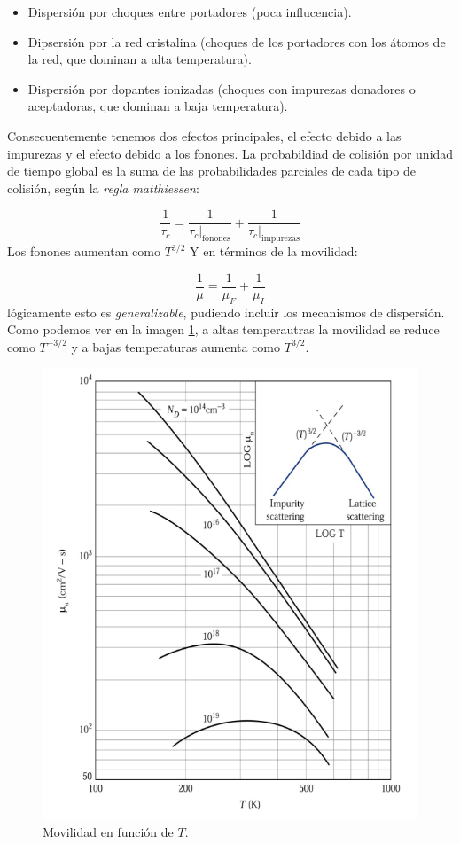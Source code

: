 \begin{itemize}
	\item Dispersión por choques entre portadores (poca influcencia).
	\item Dipsersión por la red cristalina (choques de los portadores con los átomos de la red, que dominan a alta temperatura).
	\item Dispersión por dopantes ionizadas (choques con impurezas donadores o aceptadoras, que dominan a baja temperatura).
\end{itemize}
Consecuentemente tenemos dos efectos principales, el efecto debido a las impurezas y el efecto debido a los fonones. La probabildiad de colisión por unidad de tiempo global es la suma de las probabilidades parciales de cada tipo de colisión, según la \textit{regla matthiessen}:

\begin{equation}
	\frac{1}{\tau_c} = \frac{1}{\tau_c|_{\text{fonones}}}+\frac{1}{\tau_c|_{\text{impurezas}}}
\end{equation}
Los fonones aumentan como $T^{3/2}$
Y en términos de la movilidad:

\begin{equation}
	\frac{1}{\mu}=\frac{1}{\mu_F}+\frac{1}{\mu_I}
\end{equation}
lógicamente esto es \textit{generalizable}, pudiendo incluir los mecanismos de dispersión. Como podemos ver en la imagen \cref{Fig:02-02}, a altas temperautras la movilidad se reduce como $T^{-3/2}$ y a bajas temperaturas aumenta como $T^{3/2}$.

\begin{figure}[h!] \centering
	\includegraphics[width=0.6\linewidth]{Cuerpo/Ch_02/02_Movilidad.png}
	\caption{Movilidad en función de $T$.}
	\label{Fig:02-02}
\end{figure}

